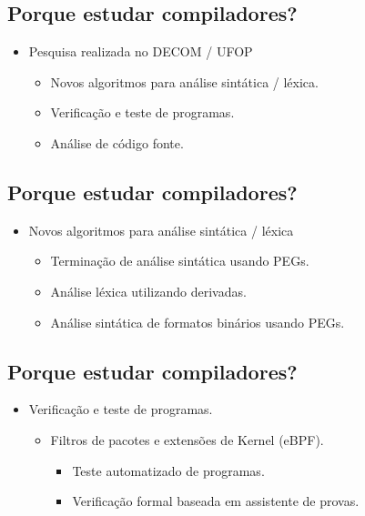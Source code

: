 \documentclass[11pt]{article}
\begin{document}
\subsection*{Porque estudar compiladores?}
\label{sec:org100ee61}

\begin{itemize}
\item Pesquisa realizada no DECOM / UFOP
\begin{itemize}
\item Novos algoritmos para análise sintática / léxica.
\item Verificação e teste de programas.
\item Análise de código fonte.
\end{itemize}
\end{itemize}
\subsection*{Porque estudar compiladores?}
\label{sec:orgc9fd063}

\begin{itemize}
\item Novos algoritmos para análise sintática / léxica
\begin{itemize}
\item Terminação de análise sintática usando PEGs.
\item Análise léxica utilizando derivadas.
\item Análise sintática de formatos binários usando PEGs.
\end{itemize}
\end{itemize}
\subsection*{Porque estudar compiladores?}
\label{sec:orgf317dca}

\begin{itemize}
\item Verificação e teste de programas.
\begin{itemize}
\item Filtros de pacotes e extensões de Kernel (eBPF).
\begin{itemize}
\item Teste automatizado de programas.
\item Verificação formal baseada em assistente de provas.
\end{itemize}
\end{itemize}
\end{itemize}
\end{document}
